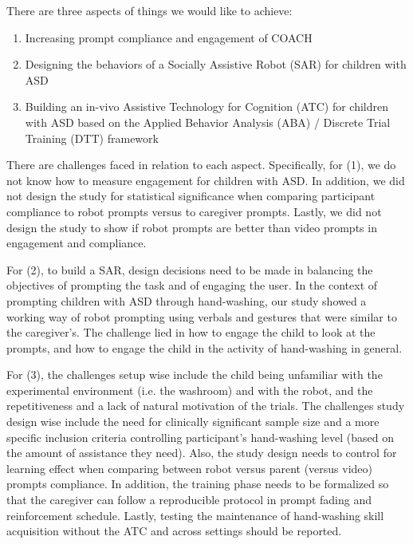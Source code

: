 \documentclass{ut-thesis}
\begin{document}
There are three aspects of things we would like to achieve:
\begin{enumerate}
	\item Increasing prompt compliance and engagement of COACH
	\item Designing the behaviors of a Socially Assistive Robot (SAR) for children with ASD
	\item Building an in-vivo Assistive Technology for Cognition (ATC) for children with ASD based on the Applied Behavior Analysis (ABA) / Discrete Trial Training (DTT) framework
\end{enumerate}

There are challenges faced in relation to each aspect.  Specifically, for (1), we do not know how to measure engagement for children with ASD.  In addition, we did not design the study for statistical significance when comparing participant compliance to robot prompts versus to caregiver prompts.  Lastly, we did not design the study to show if robot prompts are better than video prompts in engagement and compliance.

For (2), to build a SAR, design decisions need to be made in balancing the objectives of prompting the task and of engaging the user.  In the context of prompting children with ASD through hand-washing, our study showed a working way of robot prompting using verbals and gestures that were similar to the caregiver's.  The challenge lied in how to engage the child to look at the prompts, and how to engage the child in the activity of hand-washing in general.

For (3), the challenges setup wise include the child being unfamiliar with the experimental environment (i.e. the washroom) and with the robot, and the repetitiveness and a lack of natural motivation of the trials.  The challenges study design wise include the need for clinically significant sample size and a more specific inclusion criteria controlling participant's hand-washing level (based on the amount of assistance they need).  Also, the study design needs to control for learning effect when comparing between robot versus parent (versus video) prompts compliance.  In addition, the training phase needs to be formalized so that the caregiver can follow a reproducible protocol in prompt fading and reinforcement schedule.  Lastly, testing the maintenance of hand-washing skill acquisition without the ATC and across settings should be reported.
\end{document}
